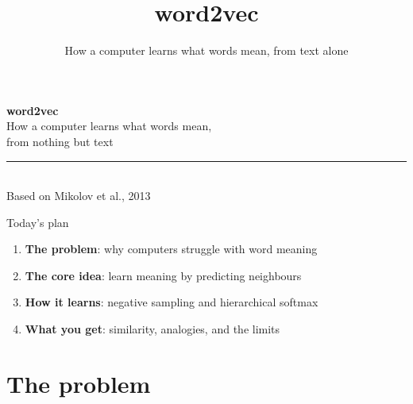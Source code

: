 \documentclass[aspectratio=169,11pt]{beamer}
\title{word2vec}
\subtitle{How a computer learns what words mean, from text alone}
\date{}
\begin{document}
\begin{frame}
  \vfill
  {\Huge\bfseries word2vec}\\[6pt]
  {\Large\color{muted} How a computer learns what words mean,\\ from nothing but text}\\[14pt]
  {\color{accent}\rule{2.4cm}{2pt}}\\[10pt]
  {\small\color{muted} Based on Mikolov et al., 2013}
  \vfill
\end{frame}

\begin{frame}{Today's plan}
  \begin{enumerate}
    \setlength{\itemsep}{10pt}
    \item<1-> \textbf{The problem}: why computers struggle with word meaning
    \item<1-> \textbf{The core idea}: learn meaning by predicting neighbours
    \item<1-> \textbf{How it learns}: negative sampling and hierarchical softmax
    \item<1-> \textbf{What you get}: similarity, analogies, and the limits
  \end{enumerate}
\end{frame}

\section{The problem}
\end{document}
